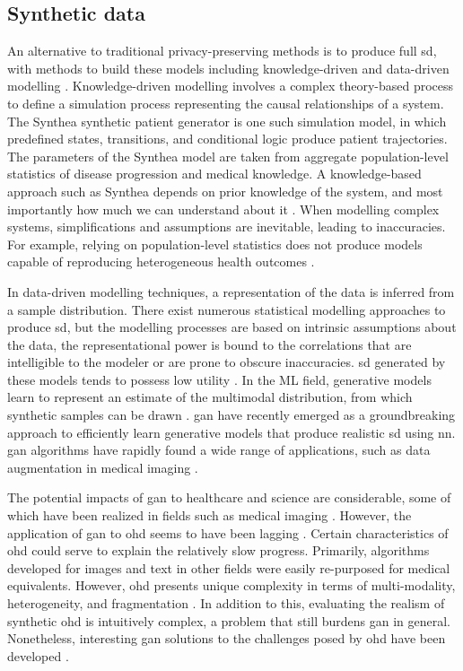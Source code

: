 \subsection{Synthetic data}
An alternative to traditional privacy-preserving methods is to produce full \gls{sd}, with methods to build these models including knowledge-driven and data-driven modelling \cite{Kim_2017}. Knowledge-driven modelling involves a complex theory-based process to define a simulation process representing the causal relationships of a system. The Synthea \cite{Walonoski_2017} synthetic patient generator is one such simulation model, in which predefined states, transitions, and conditional logic produce patient trajectories. The parameters of the Synthea model are taken from aggregate population-level statistics of disease progression and medical knowledge. A knowledge-based approach such as Synthea depends on prior knowledge of the system, and most importantly how much we can understand about it \cite{Kim_2017}. When modelling complex systems, simplifications and assumptions are inevitable, leading to inaccuracies. For example, relying on population-level statistics does not produce models capable of reproducing heterogeneous health outcomes \cite{Chen_2019}.\par
In data-driven modelling techniques, a representation of the data is inferred from a sample distribution. There exist numerous statistical modelling approaches to produce \gls{sd}, but the modelling processes are based on intrinsic assumptions about the data, the representational power is bound to the correlations that are intelligible to the modeler or are prone to obscure inaccuracies. \gls{sd} generated by these models tends to possess low utility \cite{Rankin2020}. In the ML field, generative models learn to represent an estimate of the multimodal distribution, from which synthetic samples can be drawn \cite{goodfellow2016nips}. \Gls{gan} \cite{NIPS2014_5423} have recently emerged as a groundbreaking approach to efficiently learn generative models that produce realistic \gls{sd} using \gls{nn}. \gls{gan} algorithms have rapidly found a wide range of applications, such as data augmentation in medical imaging \cite{Kadurin_2017}.\par
The potential impacts of \gls{gan} to healthcare and science are considerable, some of which have been realized in fields such as medical imaging \cite{Yi_2019}. However, the application of \gls{gan} to \gls{ohd} seems to have been lagging \cite{Xiao_2018_chall}. Certain characteristics of \gls{ohd} could serve to explain the relatively slow progress. Primarily, algorithms developed for images and text in other fields were easily re-purposed for medical equivalents. However, \gls{ohd} presents unique complexity in terms of multi-modality, heterogeneity, and fragmentation \cite{Xiao_2018_chall}. In addition to this, evaluating the realism of synthetic \gls{ohd} is intuitively complex, a problem that still burdens \gls{gan} in general. Nonetheless, interesting \gls{gan} solutions to the challenges posed by \gls{ohd} have been developed \cite{esteban2017real,Che_2017,choi2017-nt,yahi2017generative}.